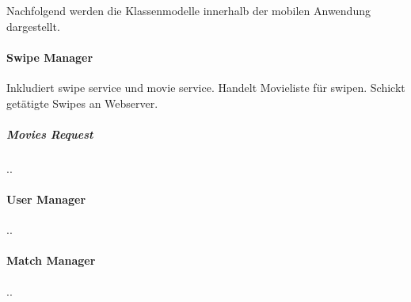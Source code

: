 Nachfolgend werden die Klassenmodelle innerhalb der mobilen Anwendung dargestellt.

\paragraph{Swipe Manager}
Inkludiert swipe service und movie service.
\newline Handelt Movieliste für swipen.
\newline Schickt getätigte Swipes an Webserver.

\subparagraph{Movies Request}
..

\paragraph{User Manager}
..

\paragraph{Match Manager}
..
